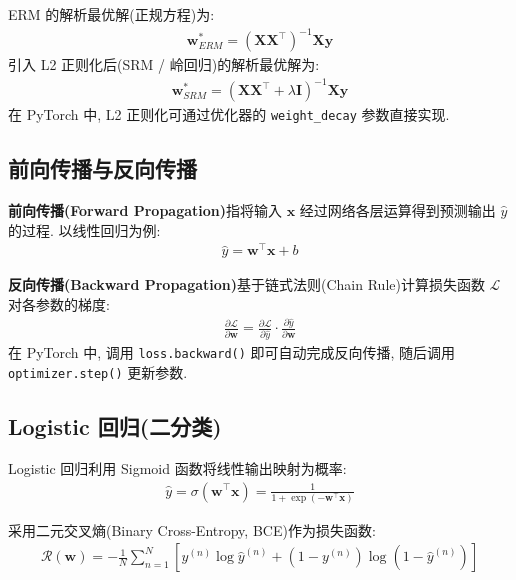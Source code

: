 \documentclass{../../nndlcourse}
\begin{document}
ERM 的解析最优解(正规方程)为: 
\begin{align}
    \boldsymbol{w}^*_{ERM} = \left(\boldsymbol{X}\boldsymbol{X}^\top\right)^{-1}\boldsymbol{X}\boldsymbol{y}
\end{align}
引入 L2 正则化后(SRM / 岭回归)的解析最优解为: 
\begin{align}
    \boldsymbol{w}^*_{SRM} = \left(\boldsymbol{X}\boldsymbol{X}^\top + \lambda\boldsymbol{I}\right)^{-1}\boldsymbol{X}\boldsymbol{y}
\end{align}
在 PyTorch 中, L2 正则化可通过优化器的 \texttt{weight\_decay} 参数直接实现.

\subsection{前向传播与反向传播}

\textbf{前向传播(Forward Propagation)}指将输入 $\boldsymbol{x}$ 经过网络各层运算得到预测输出 $\hat{y}$ 的过程. 以线性回归为例: 
\begin{align}
    \hat{y} = \boldsymbol{w}^\top \boldsymbol{x} + b
\end{align}

\textbf{反向传播(Backward Propagation)}基于链式法则(Chain Rule)计算损失函数 $\mathcal{L}$ 对各参数的梯度: 
\begin{align}
    \frac{\partial \mathcal{L}}{\partial \boldsymbol{w}} = \frac{\partial \mathcal{L}}{\partial \hat{y}} \cdot \frac{\partial \hat{y}}{\partial \boldsymbol{w}}
\end{align}
在 PyTorch 中, 调用 \texttt{loss.backward()} 即可自动完成反向传播, 随后调用 \texttt{optimizer.step()} 更新参数.

\subsection{Logistic 回归(二分类)}

Logistic 回归利用 Sigmoid 函数将线性输出映射为概率: 
\begin{align}
    \hat{y} = \sigma\left(\boldsymbol{w}^\top \boldsymbol{x}\right) = \frac{1}{1 + \exp\left(-\boldsymbol{w}^\top \boldsymbol{x}\right)}
\end{align}

采用二元交叉熵(Binary Cross-Entropy, BCE)作为损失函数: 
\begin{align}
    \mathcal{R}(\boldsymbol{w}) = -\frac{1}{N}\sum_{n=1}^N \left[y^{(n)}\log\hat{y}^{(n)} + \left(1 - y^{(n)}\right)\log\left(1 - \hat{y}^{(n)}\right)\right]
\end{align}
\end{document}
